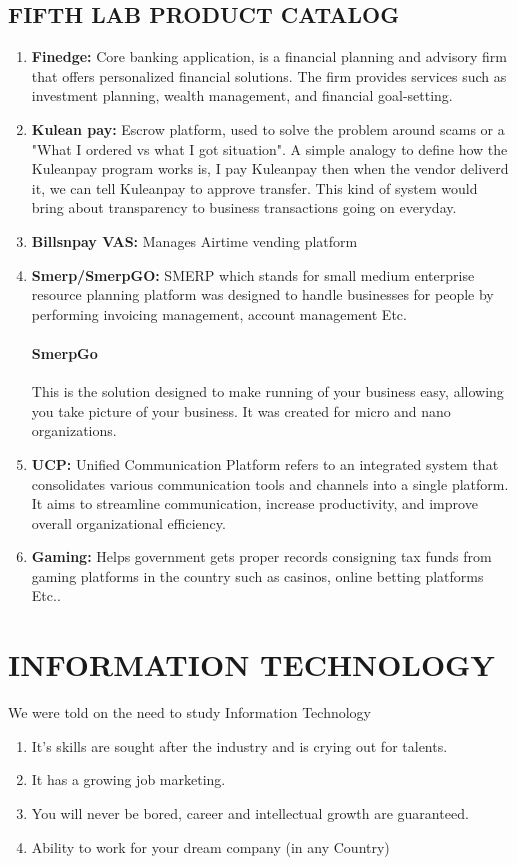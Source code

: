 \documentclass[a4paper,12pt]{report}
\begin{document}
\subsection[Product CATALOG]{FIFTH LAB PRODUCT CATALOG}
\begin{enumerate}
    \item \textbf{Finedge:} Core banking application, is a financial planning and advisory firm that offers personalized financial solutions. The firm provides services such as investment planning, wealth management, and financial goal-setting. 
    \item \textbf{Kulean pay:} Escrow platform, used to solve the problem around scams or a "What I ordered vs what I got situation". A simple analogy to define how the Kuleanpay program works is, I pay Kuleanpay then when the vendor deliverd it, we can tell Kuleanpay to approve transfer. This kind of system would bring about transparency to business transactions going on everyday. 
    \item \textbf{Billsnpay VAS:} Manages Airtime vending platform 
    \item \textbf{Smerp/SmerpGO:} SMERP which stands for small medium enterprise resource planning platform was designed to handle businesses for people by performing invoicing management, account management Etc.
          \paragraph{SmerpGo} This is the solution designed to make running of your business easy, allowing you take picture of your business. It was created for micro and nano organizations.  
    \item \textbf{UCP:} Unified Communication Platform refers to an integrated system that consolidates various communication tools and channels into a single platform. It aims to streamline communication, increase productivity, and improve overall organizational efficiency.
    \item \textbf{Gaming:} Helps government gets proper records consigning tax funds from gaming platforms in the country such as casinos, online betting platforms Etc..
\end{enumerate}

\section[IT]{INFORMATION TECHNOLOGY}
We were told on the need to study Information Technology
\begin{enumerate}
    \item It's skills are sought after the industry and is crying out for talents.
    \item It has a growing job marketing.
    \item You will never be bored, career and intellectual growth are guaranteed.
    \item Ability to work for your dream company (in any Country)
\end{enumerate}
\end{document}
